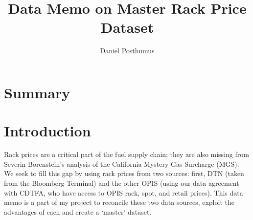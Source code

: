 \documentclass{article}
\title{Data Memo on Master Rack Price Dataset}
\author{Daniel Posthumus}
\begin{document}
\maketitle

\section{Summary}

\section{Introduction}
Rack prices are a critical part of the fuel supply chain; they are also missing from Severin Borenstein's analysis of the California Mystery Gas Surcharge (MGS). We seek to fill this gap by using rack prices from two sources: first, DTN (taken from the Bloomberg Terminal) and the other OPIS (using our data agreement with CDTFA, who have access to OPIS rack, spot, and retail prices). This data memo is a part of my project to reconcile these two data sources, exploit the advantages of each and create a `master' dataset. 
\end{document}
